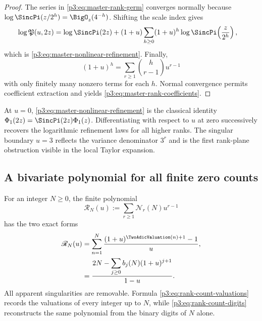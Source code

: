 \documentclass[11pt,oneside]{article}
\theoremstyle{definition}
\theoremstyle{remark}
\begin{document}
\begin{proof}
The series in \eqref{p3:eq:master-rank-germ} converges normally because
$\log\SincPi(z/2^h)=\BigO_z(4^{-h})$.  Shifting the scale index gives
\begin{align*}
 \log\mathfrak P(u,2z)
 &=\log\SincPi(2z)
 +(1+u)\sum_{h\ge0}(1+u)^h
   \log\SincPi\!\left(\frac z{2^h}\right),
\end{align*}
which is \eqref{p3:eq:master-nonlinear-refinement}.  Finally,
\[
 (1+u)^h=\sum_{r\ge1}\binom h{r-1}u^{r-1}
\]
with only finitely many nonzero terms for each $h$.  Normal convergence permits coefficient extraction and yields \eqref{p3:eq:master-rank-coefficients}.
\end{proof}

\begin{remark}
At $u=0$, \eqref{p3:eq:master-nonlinear-refinement} is the classical identity
$\Phi_1(2z)=\SincPi(2z)\Phi_1(z)$.  Differentiating with respect to $u$ at zero successively recovers the logarithmic refinement laws for all higher ranks.  The singular boundary $u=3$ reflects the variance denominator $3^r$ and is the first rank-plane obstruction visible in the local Taylor expansion.
\end{remark}

\subsection{A bivariate polynomial for all finite zero counts}

\begin{proposition}\label{p3:prop:rank-count-polynomial}
For an integer $N\ge0$, the finite polynomial
\begin{equation}\label{p3:eq:rank-count-poly-def}
 \mathscr R_N(u):=\sum_{r\ge1}\mathcal N_r(N)u^{r-1}
\end{equation}
has the two exact forms
\begin{align}
 \mathscr R_N(u)
 &=\sum_{n=1}^{N}
   \frac{(1+u)^{\TwoAdicValuation(n)+1}-1}{u},\label{p3:eq:rank-count-valuations}\\
 &=\frac{2N-\displaystyle\sum_{j\ge0}b_j(N)(1+u)^{j+1}}
 {1-u}.\label{p3:eq:rank-count-digits}
\end{align}
All apparent singularities are removable.  Formula \eqref{p3:eq:rank-count-valuations} records the valuations of every integer up to $N$, while \eqref{p3:eq:rank-count-digits} reconstructs the same polynomial from the binary digits of $N$ alone.
\end{proposition}
\end{document}
